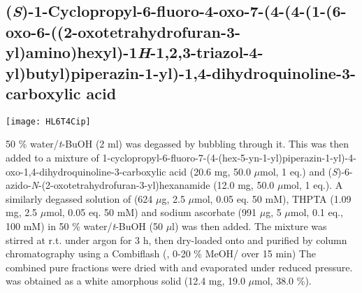 {{{{{{{{{{{{{{{{\subsection{(\textit{S})-1-Cyclopropyl-6-fluoro-4-oxo-7-(4-(4-(1-(6-oxo-6-((2-oxotetrahydrofuran\hyp{}3\hyp{}yl)amino)hexyl)-1\textit{H}-1,2,3-triazol-4-yl)butyl)piperazin-1-yl)-1,4-dihydroquin\allowbreak ol\allowbreak ine-3-carboxylic acid }
	
\begin{scheme}[H]
	\begin{center}
		\texttt{[image: HL6T4Cip]}
	\end{center}
\end{scheme}

	
50 \% water/\textit{t}-BuOH (2 ml) was degassed by bubbling  through it. This was then added to a mixture of 1-cyclopropyl-6-fluoro-7-(4-(hex-5-yn-1-yl)piperazin-1-yl)-4-oxo-1,4\hyp{}dihydro\-quinoline-3-carboxylic acid  (20.6 mg, 50.0 $\mu$mol, 1 eq.) and (\textit{S})-6-azido-\textit{N}-(2-oxotetrahydrofuran-3-yl)hexanamide  (12.0 mg, 50.0 $\mu$mol, 1 eq.).
A similarly degassed solution of  (624 $\mu$g, 2.5 $\mu$mol, 0.05 eq. 50 mM), THPTA (1.09 mg, 2.5 $\mu$mol, 0.05 eq. 50 mM) and sodium ascorbate (991 $\mu$g, 5 $\mu$mol, 0.1 eq., 100 mM) in 50 \% water/\textit{t}-BuOH (50 $\mu$l) was then added. 
The mixture was stirred at r.t. under argon for 3 h, then dry-loaded onto  and purified by column chromatography using a Combiflash (, 0-20 \% MeOH/ over 15 min)
The combined pure fractions were dried with  and evaporated under reduced pressure.
 was obtained as a white amorphous solid (12.4 mg, 19.0 $\mu$mol, 38.0 \%).
\\[1\baselineskip]
\\[1\baselineskip]
\\[1\baselineskip]
}}}}}}}}}}}}}}}}

